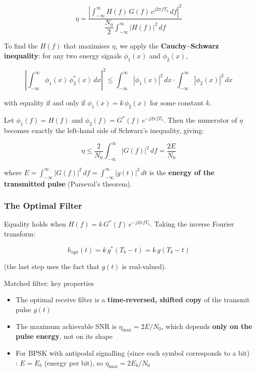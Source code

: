 \begin{equation}
\eta = \frac{\left|\displaystyle\int_{-\infty}^{\infty} H(f)\,G(f)\,e^{j2\pi f T_b}\,df\right|^2}{\dfrac{N_0}{2}\displaystyle\int_{-\infty}^{\infty} |H(f)|^2\,df}
\end{equation}

To find the $H(f)$ that maximises $\eta$, we apply the \textbf{Cauchy--Schwarz inequality}: for any two energy signals $\phi_1(x)$ and $\phi_2(x)$,

\begin{equation}
\left|\int_{-\infty}^{\infty} \phi_1(x)\,\phi_2^*(x)\,dx\right|^2 \leq \int_{-\infty}^{\infty}|\phi_1(x)|^2\,dx \cdot \int_{-\infty}^{\infty}|\phi_2(x)|^2\,dx
\end{equation}

with equality if and only if $\phi_1(x) = k\,\phi_2(x)$ for some constant $k$.

Let $\phi_1(f) = H(f)$ and $\phi_2(f) = G^*(f)\,e^{-j2\pi f T_b}$. Then the numerator of $\eta$ becomes exactly the left-hand side of Schwarz's inequality, giving:

\begin{equation}
\eta \leq \frac{2}{N_0}\int_{-\infty}^{\infty} |G(f)|^2\,df = \frac{2E}{N_0}
\end{equation}

where $E = \int_{-\infty}^{\infty}|G(f)|^2\,df = \int_{-\infty}^{\infty}|g(t)|^2\,dt$ is the \textbf{energy of the transmitted pulse} (Parseval's theorem).

\subsubsection{The Optimal Filter}

Equality holds when $H(f) = k\,G^*(f)\,e^{-j2\pi f T_b}$. Taking the inverse Fourier transform:

\begin{equation}
h_{\text{opt}}(t) = k\,g^*(T_b - t) = k\,g(T_b - t)
\end{equation}

(the last step uses the fact that $g(t)$ is real-valued).

\begin{KeyBox}{Matched filter: key properties}
\begin{itemize}
\item The optimal receive filter is a \textbf{time-reversed, shifted copy} of the transmit pulse $g(t)$
\item The maximum achievable SNR is $\eta_{\max} = 2E/N_0$, which depends \textbf{only on the pulse energy}, not on its shape
\item For BPSK with antipodal signalling (since each symbol corresponds to a bit) : $E = E_b$ (energy per bit), so $\eta_{\max} = 2E_b/N_0$
\end{itemize}
\end{KeyBox}

